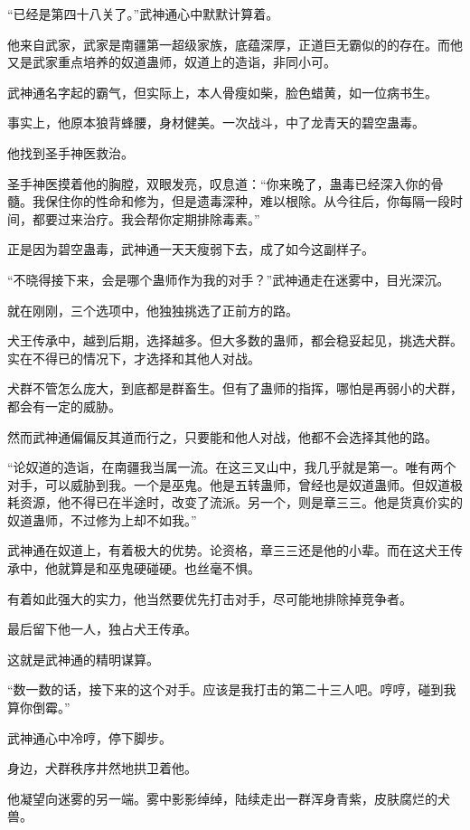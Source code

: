 
\begin{this_body}

“已经是第四十八关了。”武神通心中默默计算着。

他来自武家，武家是南疆第一超级家族，底蕴深厚，正道巨无霸似的的存在。而他又是武家重点培养的奴道蛊师，奴道上的造诣，非同小可。

武神通名字起的霸气，但实际上，本人骨瘦如柴，脸色蜡黄，如一位病书生。

事实上，他原本狼背蜂腰，身材健美。一次战斗，中了龙青天的碧空蛊毒。

他找到圣手神医救治。

圣手神医摸着他的胸膛，双眼发亮，叹息道：“你来晚了，蛊毒已经深入你的骨髓。我保住你的性命和修为，但是遗毒深种，难以根除。从今往后，你每隔一段时间，都要过来治疗。我会帮你定期排除毒素。”

正是因为碧空蛊毒，武神通一天天瘦弱下去，成了如今这副样子。

“不晓得接下来，会是哪个蛊师作为我的对手？”武神通走在迷雾中，目光深沉。

就在刚刚，三个选项中，他独独挑选了正前方的路。

犬王传承中，越到后期，选择越多。但大多数的蛊师，都会稳妥起见，挑选犬群。实在不得已的情况下，才选择和其他人对战。

犬群不管怎么庞大，到底都是群畜生。但有了蛊师的指挥，哪怕是再弱小的犬群，都会有一定的威胁。

然而武神通偏偏反其道而行之，只要能和他人对战，他都不会选择其他的路。

“论奴道的造诣，在南疆我当属一流。在这三叉山中，我几乎就是第一。唯有两个对手，可以威胁到我。一个是巫鬼。他是五转蛊师，曾经也是奴道蛊师。但奴道极耗资源，他不得已在半途时，改变了流派。另一个，则是章三三。他是货真价实的奴道蛊师，不过修为上却不如我。”

武神通在奴道上，有着极大的优势。论资格，章三三还是他的小辈。而在这犬王传承中，他就算是和巫鬼硬碰硬。也丝毫不惧。

有着如此强大的实力，他当然要优先打击对手，尽可能地排除掉竞争者。

最后留下他一人，独占犬王传承。

这就是武神通的精明谋算。

“数一数的话，接下来的这个对手。应该是我打击的第二十三人吧。哼哼，碰到我算你倒霉。”

武神通心中冷哼，停下脚步。

身边，犬群秩序井然地拱卫着他。

他凝望向迷雾的另一端。雾中影影绰绰，陆续走出一群浑身青紫，皮肤腐烂的犬兽。


\end{this_body}
